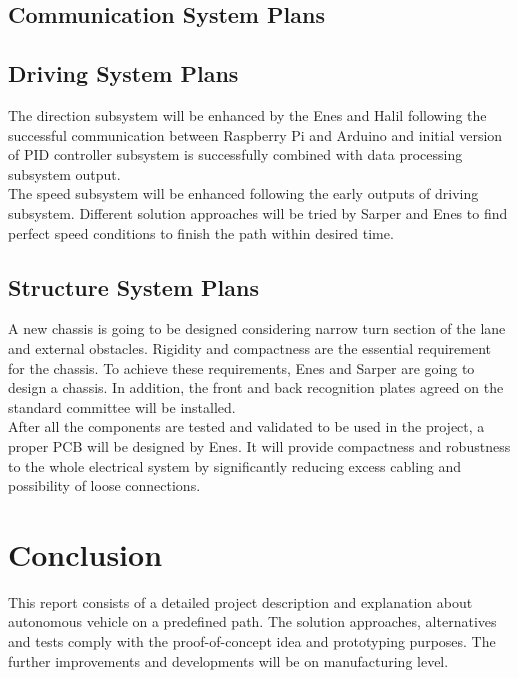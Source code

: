 \documentclass[a4paper,12pt]{article}
\begin{document}
	
	\subsection{Communication System Plans}
	\subsection{Driving System Plans}
		The direction subsystem will be enhanced by the Enes and Halil following the successful communication between Raspberry Pi and Arduino and initial version of PID controller subsystem is successfully combined with data processing subsystem output. \\
		
		The speed subsystem will be enhanced following the early outputs of driving subsystem. Different solution approaches will be tried by Sarper and Enes to find perfect speed conditions to finish the path within desired time.
	
	\subsection{Structure System Plans}
	
	A new chassis is going to be designed considering narrow turn section of the lane and  external obstacles. Rigidity and compactness are  the essential requirement for the chassis. To achieve these requirements, Enes and Sarper are going to design a chassis. In addition, the front and back recognition plates agreed on the standard committee will be installed.\\
	
	After all the components are tested and validated to be used in the project, a proper PCB will be designed by Enes. It will provide compactness and robustness to the whole electrical system by significantly reducing excess cabling and possibility of loose connections.
	
	\section{Conclusion}
	This report consists of a detailed project description and explanation about autonomous vehicle on a predefined path. The solution approaches, alternatives and tests comply with the proof-of-concept idea and prototyping purposes. The further improvements and developments will be on manufacturing level.\\
	
\end{document}
